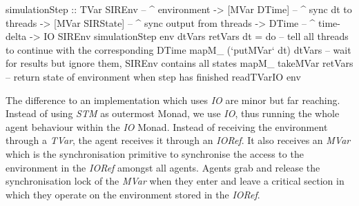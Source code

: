 \begin{HaskellCode}
simulationStep :: TVar SIREnv     -- ^ environment 
               -> [MVar DTime]    -- ^ sync dt to threads
               -> [MVar SIRState] -- ^ sync output from threads
               -> DTime           -- ^ time-delta
               -> IO SIREnv
simulationStep env dtVars retVars dt = do
  -- tell all threads to continue with the corresponding DTime
  mapM_ (`putMVar` dt) dtVars
  -- wait for results but ignore them, SIREnv contains all states
  mapM_ takeMVar retVars
  -- return state of environment when step has finished
  readTVarIO env
\end{HaskellCode}

The difference to an implementation which uses \textit{IO} are minor but far reaching. Instead of using \textit{STM} as outermost Monad, we use \textit{IO}, thus running the whole agent behaviour within the \textit{IO} Monad. Instead of receiving the environment through a \textit{TVar}, the agent receives it through an \textit{IORef}. It also receives an \textit{MVar} which is the synchronisation primitive to synchronise the access to the environment in the \textit{IORef} amongst all agents. Agents grab and release the synchronisation lock of the \textit{MVar} when they enter and leave a critical section in which they operate on the environment stored in the \textit{IORef}.